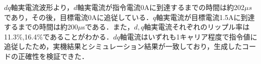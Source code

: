 $dq$軸実電流波形より，$d$軸実電流が指令電流0Aに到達するまでの時間は約202$\mu s$であり，その後，目標電流0Aに追従している．$q$軸実電流が目標電流1.5Aに到達するまでの時間は約200$\mu$sである．また，$d,q$軸実電流それぞれのリップル率は11.3$\%$,16.4$\%$であることがわかる．$dq$軸電流はいずれも1キャリア程度で指令値に追従したため，実機結果とシミュレーション結果が一致しており，生成したコードの正確性を検証できた．




% 
